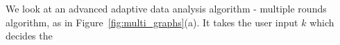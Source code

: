 \begin{example}
\label{ex:multiplerounds}
%
We look at an advanced adaptive data analysis algorithm - multiple rounds algorithm, as in Figure~\ref{fig:multi_graphs}(a).
%
%
%
It takes the user input $k$ which decides the 

\end{example}
